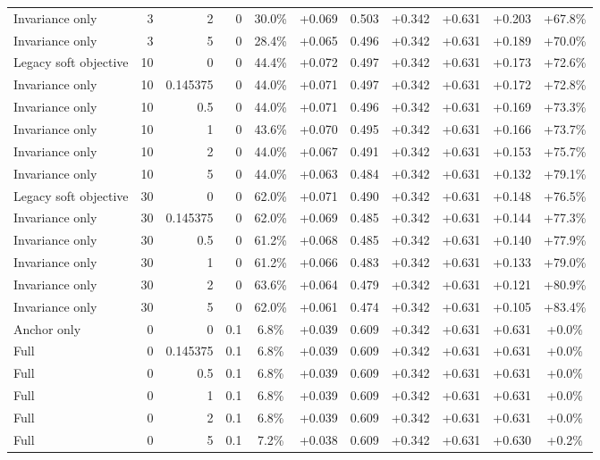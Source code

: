 \begin{table}[htbp]
\begin{tabular}{lrrrccccccc}
Invariance only & 3 & 2 & 0 & 30.0\% & +0.069 & 0.503 & +0.342 & +0.631 & +0.203 & +67.8\% \\
Invariance only & 3 & 5 & 0 & 28.4\% & +0.065 & 0.496 & +0.342 & +0.631 & +0.189 & +70.0\% \\
Legacy soft objective & 10 & 0 & 0 & 44.4\% & +0.072 & 0.497 & +0.342 & +0.631 & +0.173 & +72.6\% \\
Invariance only & 10 & 0.145375 & 0 & 44.0\% & +0.071 & 0.497 & +0.342 & +0.631 & +0.172 & +72.8\% \\
Invariance only & 10 & 0.5 & 0 & 44.0\% & +0.071 & 0.496 & +0.342 & +0.631 & +0.169 & +73.3\% \\
Invariance only & 10 & 1 & 0 & 43.6\% & +0.070 & 0.495 & +0.342 & +0.631 & +0.166 & +73.7\% \\
Invariance only & 10 & 2 & 0 & 44.0\% & +0.067 & 0.491 & +0.342 & +0.631 & +0.153 & +75.7\% \\
Invariance only & 10 & 5 & 0 & 44.0\% & +0.063 & 0.484 & +0.342 & +0.631 & +0.132 & +79.1\% \\
Legacy soft objective & 30 & 0 & 0 & 62.0\% & +0.071 & 0.490 & +0.342 & +0.631 & +0.148 & +76.5\% \\
Invariance only & 30 & 0.145375 & 0 & 62.0\% & +0.069 & 0.485 & +0.342 & +0.631 & +0.144 & +77.3\% \\
Invariance only & 30 & 0.5 & 0 & 61.2\% & +0.068 & 0.485 & +0.342 & +0.631 & +0.140 & +77.9\% \\
Invariance only & 30 & 1 & 0 & 61.2\% & +0.066 & 0.483 & +0.342 & +0.631 & +0.133 & +79.0\% \\
Invariance only & 30 & 2 & 0 & 63.6\% & +0.064 & 0.479 & +0.342 & +0.631 & +0.121 & +80.9\% \\
Invariance only & 30 & 5 & 0 & 62.0\% & +0.061 & 0.474 & +0.342 & +0.631 & +0.105 & +83.4\% \\
Anchor only & 0 & 0 & 0.1 & 6.8\% & +0.039 & 0.609 & +0.342 & +0.631 & +0.631 & +0.0\% \\
Full & 0 & 0.145375 & 0.1 & 6.8\% & +0.039 & 0.609 & +0.342 & +0.631 & +0.631 & +0.0\% \\
Full & 0 & 0.5 & 0.1 & 6.8\% & +0.039 & 0.609 & +0.342 & +0.631 & +0.631 & +0.0\% \\
Full & 0 & 1 & 0.1 & 6.8\% & +0.039 & 0.609 & +0.342 & +0.631 & +0.631 & +0.0\% \\
Full & 0 & 2 & 0.1 & 6.8\% & +0.039 & 0.609 & +0.342 & +0.631 & +0.631 & +0.0\% \\
Full & 0 & 5 & 0.1 & 7.2\% & +0.038 & 0.609 & +0.342 & +0.631 & +0.630 & +0.2\% \\

\end{tabular}
\end{table}
